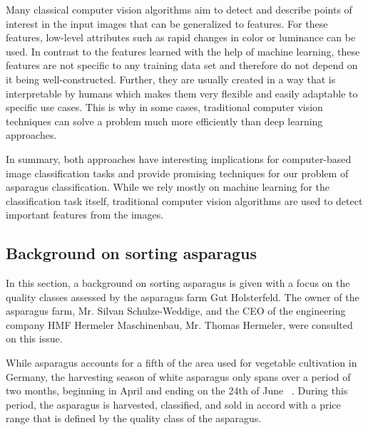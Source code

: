 Many classical computer vision algorithms aim to detect and describe points of interest in the input images that can be generalized to features. For these features, low-level attributes such as rapid changes in color or luminance can be used. In contrast to the features learned with the help of machine learning, these features are not specific to any training data set and therefore do not depend on it being well-constructed. Further, they are usually created in a way that is interpretable by humans which makes them very flexible and easily adaptable to specific use cases. This is why in some cases, traditional computer vision techniques can solve a problem much more efficiently than deep learning approaches.

\bigskip
In summary, both approaches have interesting implications for computer-based image classification tasks and provide promising techniques for our problem of asparagus classification. While we rely mostly on machine learning for the classification task itself, traditional computer vision algorithms are used to detect important features from the images.


\subsection{Background on sorting asparagus}
\label{sec:BackgroundSortingAsparagus}

In this section, a background on sorting asparagus is given with a focus on the quality classes assessed by the asparagus farm Gut Holsterfeld. The owner of the asparagus farm, Mr. Silvan Schulze-Weddige, and the CEO of the engineering company HMF Hermeler Maschinenbau, Mr. Thomas Hermeler, were consulted on this issue.

\bigskip
While asparagus accounts for a fifth of the area used for vegetable cultivation in Germany, the harvesting season of white asparagus only spans over a period of two months, beginning in April and ending on the 24th of June ~\citep{spargelstatistik,nrw2018spargel}. During this period, the asparagus is harvested, classified, and sold in accord with a price range that is defined by the quality class of the asparagus.


